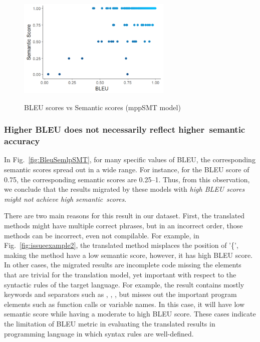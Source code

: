 \begin{figure}
\caption{BLEU scores vs Semantic scores (mppSMT model)}
\centering
\includegraphics[width=2.9in]{img/bleuvssemantic_mppSMT.png}
\label{fig:BleuSemMppSMT}
\end{figure}

\subsubsection{{\bf Higher BLEU does not necessarily reflect higher~semantic accuracy}}

In Fig.~\ref{fig:BleuSemlpSMT}, for many specific values of BLEU, the
corresponding semantic scores spread out in a wide range. For
instance, for the BLEU score of 0.75, the corresponding semantic scores
are 0.25--1.
Thus, from this observation, we conclude that the results migrated by
these models with {\em high BLEU scores might not achieve high
  semantic~scores}.
%

There are two main reasons for this result in our dataset.  First, the
translated methods might have multiple correct phrases, but in an
incorrect order, those methods can be incorrect, even not compilable.
%
For example, in Fig.~\ref{fig:issueexample2}, the translated method
misplaces the position of '\{', making the method have a low
semantic score, however, it has high BLEU score.
%
In other cases, the migrated results are incomplete code missing the
elements that are trivial for the translation model, yet important
with respect to the syntactic rules of the target language. For
example, the result contains mostly keywords and separators such as
, , \code{()}, but misses out the important
program elements such as function calls or variable names. In this
case, it will have low semantic score while having a moderate to high
BLEU score. These cases indicate the limitation of BLEU metric
in evaluating the translated results in programming language in which
syntax rules are well-defined.



